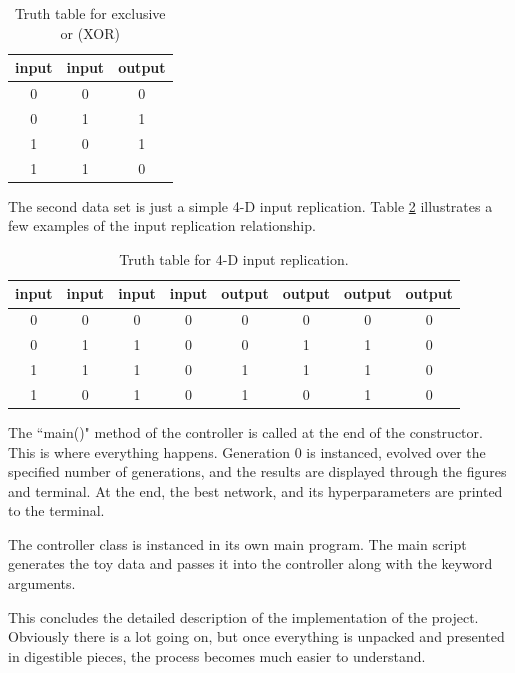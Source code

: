 \documentclass[12pt]{report}
\begin{document}
\begin{table}[hbt!]
    \centering
    \caption{Truth table for exclusive or (XOR)}
    \begin{tabular}{c|c||c}
    \textbf{input} & \textbf{input} & \textbf{output}\\
    \hline
    \hline
    0 & 0 & 0\\
    0 & 1 & 1\\
    1 & 0 & 1\\
    1 & 1 & 0\\
    \end{tabular}
    \label{truth1}
\end{table}
The second data set is just a simple 4-D input replication.
Table \ref{truth2} illustrates a few examples of the input replication relationship.
\begin{table}[hbt!]
    \centering
    \caption{Truth table for 4-D input replication.}
    \begin{tabular}{c|c|c|c||c|c|c|c}
    \textbf{input} & \textbf{input} & \textbf{input} & \textbf{input} & \textbf{output} & \textbf{output} & \textbf{output} & \textbf{output}\\
    \hline
    \hline
    0 & 0 & 0 & 0 & 0 & 0 & 0 & 0\\
    0 & 1 & 1 & 0 & 0 & 1 & 1 & 0\\
    1 & 1 & 1 & 0 & 1 & 1 & 1 & 0\\
    1 & 0 & 1 & 0 & 1 & 0 & 1 & 0\\
    \end{tabular}
    \label{truth2}
\end{table}

The ``main()" method of the controller is called at the end of the constructor. This is where everything happens. Generation 0 is instanced, evolved over the specified number of generations, and the results are displayed through the figures and terminal. At the end, the best network, and its hyperparameters are printed to the terminal.

The controller class is instanced in its own main program. The main script generates the toy data and passes it into the controller along with the keyword arguments.



This concludes the detailed description of the implementation of the project. Obviously there is a lot going on, but once everything is unpacked and presented in digestible pieces, the process becomes much easier to understand.
\end{document}
